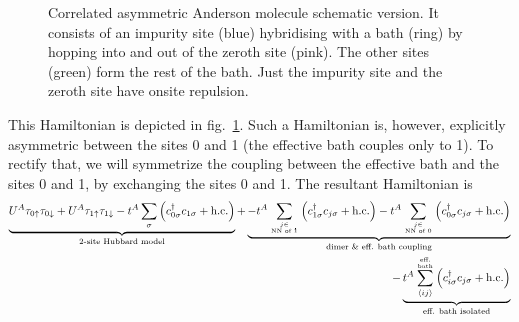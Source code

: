 \documentclass[10pt]{report}
\numberwithin{equation}{section}
\begin{document}
{\begin{figure}[htpb]
 	\caption{Correlated asymmetric Anderson molecule schematic version. It consists of an impurity site (blue) hybridising with a bath (ring) by hopping into and out of the zeroth site (pink). The other sites (green) form the rest of the bath. Just the impurity site and the zeroth site have onsite repulsion.}
 	\label{and_mol}
 \end{figure}
 This Hamiltonian is depicted in fig.~\ref{and_mol}. Such a Hamiltonian is, however, explicitly asymmetric between the sites 0 and 1 (the effective bath couples only to 1). To rectify that, we will symmetrize the coupling between the effective bath and the sites 0 and 1, by exchanging the sites 0 and 1. The resultant Hamiltonian is
 \begin{equation}\begin{aligned}
 	\underbrace{U^A\tau_{0 \uparrow}\tau_{0 \downarrow} + U^A\tau_{1 \uparrow}\tau_{1 \downarrow} - t^A\sum_{\sigma}\left(c^\dagger_{0\sigma}c_{1\sigma} + \text{h.c.}\right)}_\text{2-site Hubbard model} +\underbrace{- t^A\sum_{j \in \atop{\text{NN of 1}}}\left(c^\dagger_{1\sigma}c_{j\sigma} + \text{h.c.}\right)- t^A\sum_{j \in \atop{\text{NN of 0}}}\left(c^\dagger_{0\sigma}c_{j\sigma} + \text{h.c.}\right)}_\text{dimer \& eff. bath coupling} \\
 	- \underbrace{t^A \sum_{\left<ij \right>}^{\text{eff.} \atop{\text{bath}}}\left(c^\dagger_{i\sigma}c_{j\sigma} + \text{h.c.}\right)}_\text{eff. bath isolated}
 \end{aligned}\end{equation}

}
\end{document}
